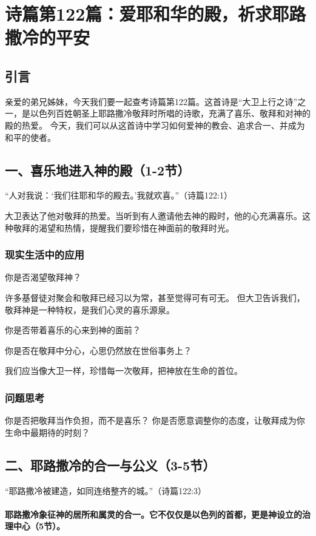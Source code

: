 \documentclass[a4paper, 12pt]{article}
\begin{document}
\section{诗篇第122篇：爱耶和华的殿，祈求耶路撒冷的平安}
\subsection*{引言}
亲爱的弟兄姊妹，今天我们要一起查考诗篇第122篇。这首诗是“大卫上行之诗”之一，是以色列百姓朝圣上耶路撒冷敬拜时所唱的诗歌，充满了喜乐、敬拜和对神的殿的热爱。
今天，我们可以从这首诗中学习如何爱神的教会、追求合一、并成为和平的使者。

\subsection*{一、喜乐地进入神的殿（1-2节）}
“人对我说：‘我们往耶和华的殿去。’我就欢喜。”（诗篇122:1）

大卫表达了他对敬拜的热爱。当听到有人邀请他去神的殿时，他的心充满喜乐。这种敬拜的渴望和热情，提醒我们要珍惜在神面前的敬拜时光。

\subsubsection*{现实生活中的应用}
\hspace{0.6cm}你是否渴望敬拜神？

许多基督徒对聚会和敬拜已经习以为常，甚至觉得可有可无。
但大卫告诉我们，敬拜神是一种特权，是我们心灵的喜乐源泉。

你是否带着喜乐的心来到神的面前？

你是否在敬拜中分心，心思仍然放在世俗事务上？

我们应当像大卫一样，珍惜每一次敬拜，把神放在生命的首位。
\subsubsection*{问题思考}
你是否把敬拜当作负担，而不是喜乐？
你是否愿意调整你的态度，让敬拜成为你生命中最期待的时刻？
\subsection*{二、耶路撒冷的合一与公义（3-5节）}
“耶路撒冷被建造，如同连络整齐的城。”（诗篇122:3）

\paragraph{耶路撒冷象征神的居所和属灵的合一。它不仅仅是以色列的首都，更是神设立的治理中心（5节）。}
\end{document}
